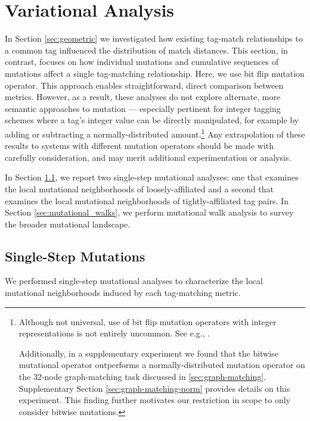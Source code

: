 \section{Variational Analysis} \label{sec:variational}

In Section \ref{sec:geometric} we investigated how existing tag-match relationships to a common tag influenced the distribution of match distances.
This section, in contrast, focuses on how individual mutations and cumulative sequences of mutations affect a single tag-matching relationship.
Here, we use bit flip mutation operator.
This approach enables straightforward, direct comparison between metrics.
However, as a result, these analyses do not explore alternate, more semantic approaches to mutation --- especially pertinent for integer tagging schemes where a tag's integer value can be directly manipulated, for example by adding or subtracting a normally-distributed amount.\footnote{
Although not universal, use of bit flip mutation operators with integer representations is not entirely uncommon.
See e.g., \cite{downing2015intelligence}.

Additionally, in a supplementary experiment we found that the bitwise mutational operator outperforms a normally-distributed mutation operator on the 32-node graph-matching task discussed in \ref{sec:graph-matching}.
Supplementary Section \ref{sec:graph-matching-norm} provides details on this experiment.
This finding further motivates our restriction in scope to only consider bitwise mutations.
}
Any extrapolation of these results to systems with different mutation operators should be made with carefully consideration, and may merit additional experimentation or analysis.

In Section \ref{sec:single_step}, we report two single-step mutational analyses: one that examines the local mutational neighborhoods of loosely-affiliated and a second that examines the local mutational neighborhoods of tightly-affiliated tag pairs.
In Section \ref{sec:mutational_walks}, we perform mutational walk analysis to survey the broader mutational landscape.

\subsection{Single-Step Mutations} \label{sec:single_step}



We performed single-step mutational analyses to characterize the local mutational neighborhoods induced by each tag-matching metric.

